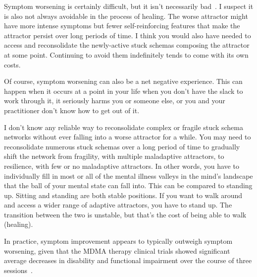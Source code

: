 \documentclass[11pt,oneside]{book}
\let\cite\parencite
\begin{document}
Symptom worsening is certainly difficult, but it isn't necessarily bad~\cite{hayes2020complex}. I suspect it is also not always avoidable in the process of healing. The worse attractor might have more intense symptoms but fewer self-reinforcing features that make the attractor persist over long periods of time. I think you would also have needed to access and reconsolidate the newly-active stuck schemas composing the attractor at some point. Continuing to avoid them indefinitely tends to come with its own costs.

Of course, symptom worsening can also be a net negative experience. This can happen when it occurs at a point in your life when you don't have the slack to work through it, it seriously harms you or someone else, or you and your practitioner don't know how to get out of it.

I don't know any reliable way to reconsolidate complex or fragile stuck schema networks without ever falling into a worse attractor for a while. You may need to reconsolidate numerous stuck schemas over a long period of time to gradually shift the network from fragility, with multiple maladaptive attractors, to resilience, with few or no maladaptive attractors. In other words, you have to individually fill in most or all of the mental illness valleys in the mind's landscape that the ball of your mental state can fall into. This can be compared to standing up. Sitting and standing are both stable positions. If you want to walk around and access a wider range of adaptive attractors, you have to stand up. The transition between the two is unstable, but that's the cost of being able to walk (healing).

In practice, symptom improvement appears to typically outweigh symptom worsening, given that the MDMA therapy clinical trials showed significant average decreases in disability and functional impairment over the course of three sessions~\cite{mitchellMDMAClinicalTrial,mitchellMDMAClinicalTrial2}.
\end{document}
